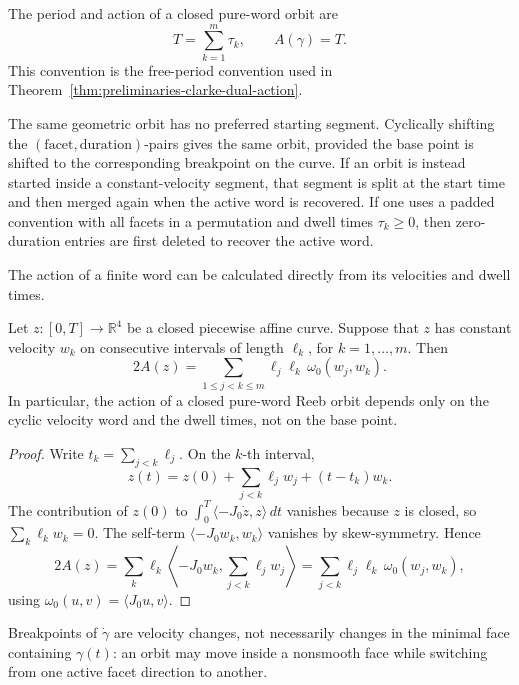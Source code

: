 The period and action of a closed pure-word orbit are
\[
  T=\sum_{k=1}^m \tau_k,
  \qquad
  A(\gamma)=T.
\]
This convention is the free-period convention used in
Theorem~\ref{thm:preliminaries-clarke-dual-action}.

The same geometric orbit has no preferred starting segment. Cyclically shifting
the \((\text{facet},\text{duration})\)-pairs gives the same orbit, provided the
base point is shifted to the corresponding breakpoint on the curve. If an orbit
is instead started inside a constant-velocity segment, that segment is split at
the start time and then merged again when the active word is recovered. If one
uses a padded convention with all facets in a permutation and dwell times
\(\tau_k\geq0\), then zero-duration entries are first deleted to recover the
active word.

The action of a finite word can be calculated directly from its velocities and
dwell times.

\begin{lemma}\label{lem:preliminaries-shoelace}
Let \(z\colon[0,T]\to\mathbb{R}^4\) be a closed piecewise affine curve. Suppose
that \(z\) has constant velocity \(w_k\) on consecutive intervals of length
\(\ell_k\), for \(k=1,\ldots,m\). Then
\begin{equation}\label{eq:preliminaries-shoelace}
  2A(z)
  =
  \sum_{1\leq j<k\leq m}
    \ell_j\ell_k\,\omega_0(w_j,w_k).
\end{equation}
In particular, the action of a closed pure-word Reeb orbit depends only on the
cyclic velocity word and the dwell times, not on the base point.
\end{lemma}

\begin{proof}
Write \(t_k=\sum_{j<k}\ell_j\). On the \(k\)-th interval,
\[
  z(t)=z(0)+\sum_{j<k}\ell_jw_j+(t-t_k)w_k.
\]
The contribution of \(z(0)\) to
\(\int_0^T\langle -J_0\dot z,z\rangle\,dt\) vanishes because \(z\) is closed,
so \(\sum_k\ell_kw_k=0\). The self-term
\(\langle -J_0w_k,w_k\rangle\) vanishes by skew-symmetry. Hence
\[
  2A(z)
  =
  \sum_k
    \ell_k\left\langle -J_0w_k,\sum_{j<k}\ell_jw_j\right\rangle
  =
  \sum_{j<k}\ell_j\ell_k\,\omega_0(w_j,w_k),
\]
using \(\omega_0(u,v)=\langle J_0u,v\rangle\).
\end{proof}

Breakpoints of \(\dot{\gamma}\) are velocity changes, not necessarily changes
in the minimal face containing \(\gamma(t)\): an orbit may move inside a
nonsmooth face while switching from one active facet direction to another.

